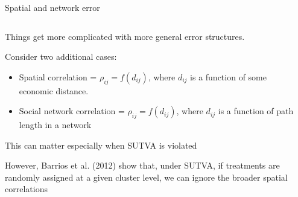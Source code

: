 \documentclass[notes,11pt, aspectratio=169]{beamer}
\newenvironment{wideitemize}{\itemize\addtolength{\itemsep}{10pt}}{\enditemize}
\begin{document}
\begin{frame}{Spatial and network error}
\begin{columns}[T] %
\begin{column}{.8\textwidth}
  \begin{wideitemize}
  \item Things get more complicated with more general error structures.
  \item Consider two additional cases:
    \begin{itemize}
    \item Spatial correlation = $\rho_{ij} = f(d_{ij})$, where $d_{ij}$ is a function of some economic distance.
    \item Social network correlation = $\rho_{ij} = f(d_{ij})$, where $d_{ij}$ is a function of path length in a network
    \end{itemize}
  \item This can matter especially when SUTVA is violated
  \item However, Barrios et al. (2012) show that, under SUTVA, if
    treatments are randomly assigned at a given cluster level, we can
    ignore the broader spatial correlations
  \end{wideitemize}
  \end{column}%
  \hfill%
  \begin{column}{.5\textwidth}
  \end{column}
\end{columns}
  
\end{frame}
\end{document}
